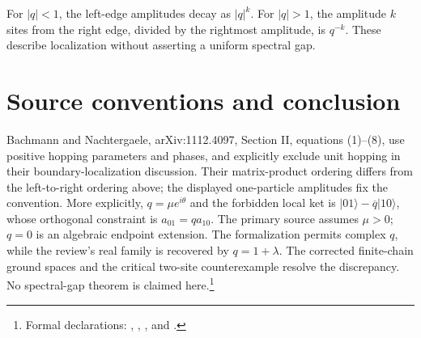 \documentclass{article}
\begin{document}
For $|q|<1$, the left-edge amplitudes decay as $|q|^k$. For $|q|>1$, the
amplitude $k$ sites from the right edge, divided by the rightmost amplitude,
is $q^{-k}$. These describe localization without asserting a uniform spectral gap.

\section{Source conventions and conclusion}
Bachmann and Nachtergaele, arXiv:1112.4097, Section II, equations (1)--(8),
use positive hopping parameters and phases, and explicitly exclude unit hopping
in their boundary-localization discussion. Their matrix-product ordering differs
from the left-to-right ordering above; the displayed one-particle amplitudes
fix the convention. More explicitly, $q=\mu e^{i\theta}$ and the forbidden
local ket is $|01\rangle-\overline q|10\rangle$, whose orthogonal
constraint is $a_{01}=q a_{10}$. The primary source assumes $\mu>0$;
$q=0$ is an algebraic endpoint extension. The formalization permits complex $q$, while the review's
real family is recovered by $q=1+\lambda$.
The corrected finite-chain ground spaces and the critical two-site counterexample
resolve the discrepancy. No spectral-gap theorem is claimed here.\footnote{Formal declarations:
    ,
    ,
    , and
    .}
\end{document}
